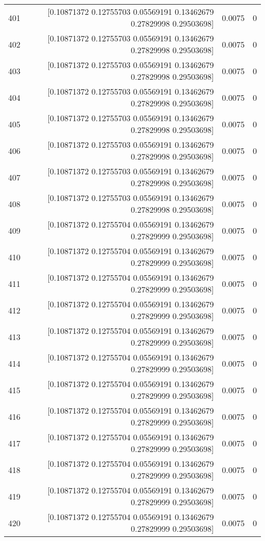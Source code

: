 \begin{longtable}{lrrr}
401 & [0.10871372 0.12755703 0.05569191 0.13462679 0.27829998 0.29503698] & 0.0075 & 0 \\
402 & [0.10871372 0.12755703 0.05569191 0.13462679 0.27829998 0.29503698] & 0.0075 & 0 \\
403 & [0.10871372 0.12755703 0.05569191 0.13462679 0.27829998 0.29503698] & 0.0075 & 0 \\
404 & [0.10871372 0.12755703 0.05569191 0.13462679 0.27829998 0.29503698] & 0.0075 & 0 \\
405 & [0.10871372 0.12755703 0.05569191 0.13462679 0.27829998 0.29503698] & 0.0075 & 0 \\
406 & [0.10871372 0.12755703 0.05569191 0.13462679 0.27829998 0.29503698] & 0.0075 & 0 \\
407 & [0.10871372 0.12755703 0.05569191 0.13462679 0.27829998 0.29503698] & 0.0075 & 0 \\
408 & [0.10871372 0.12755703 0.05569191 0.13462679 0.27829998 0.29503698] & 0.0075 & 0 \\
409 & [0.10871372 0.12755704 0.05569191 0.13462679 0.27829999 0.29503698] & 0.0075 & 0 \\
410 & [0.10871372 0.12755704 0.05569191 0.13462679 0.27829999 0.29503698] & 0.0075 & 0 \\
411 & [0.10871372 0.12755704 0.05569191 0.13462679 0.27829999 0.29503698] & 0.0075 & 0 \\
412 & [0.10871372 0.12755704 0.05569191 0.13462679 0.27829999 0.29503698] & 0.0075 & 0 \\
413 & [0.10871372 0.12755704 0.05569191 0.13462679 0.27829999 0.29503698] & 0.0075 & 0 \\
414 & [0.10871372 0.12755704 0.05569191 0.13462679 0.27829999 0.29503698] & 0.0075 & 0 \\
415 & [0.10871372 0.12755704 0.05569191 0.13462679 0.27829999 0.29503698] & 0.0075 & 0 \\
416 & [0.10871372 0.12755704 0.05569191 0.13462679 0.27829999 0.29503698] & 0.0075 & 0 \\
417 & [0.10871372 0.12755704 0.05569191 0.13462679 0.27829999 0.29503698] & 0.0075 & 0 \\
418 & [0.10871372 0.12755704 0.05569191 0.13462679 0.27829999 0.29503698] & 0.0075 & 0 \\
419 & [0.10871372 0.12755704 0.05569191 0.13462679 0.27829999 0.29503698] & 0.0075 & 0 \\
420 & [0.10871372 0.12755704 0.05569191 0.13462679 0.27829999 0.29503698] & 0.0075 & 0 \\

\end{longtable}

